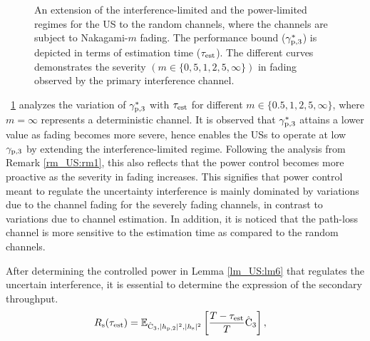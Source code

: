 \begin{figure}[!ht]
\caption{An extension of the interference-limited and the power-limited regimes for the US to the random channels, where the channels are subject to Nakagami-$m$ fading. The performance bound (${\gamma}_{\text{p,3}}^*$) is depicted in terms of estimation time ($\tau_{\text{est}}$). The different curves demonstrates the severity $(m \in \{0,5,1,2,5, \infty \})$ in fading observed by the primary interference channel.}
\label{fig_US:or_fad}
\end{figure}
\begin{remark} \label{rm_US:rm2}
\normalfont
\figurename~\ref{fig_US:or_fad} analyzes the variation of ${\gamma}_{\text{p,3}}^*$ with $\tau_{\text{est}}$ for different $m \in \{0.5, 1, 2, 5, \infty\}$, where $m = \infty$ represents a deterministic channel. It is observed that ${\gamma}_{\text{p,3}}^*$ attains a lower value as fading becomes more severe, hence enables the USs to operate at low ${\gamma}_{\text{p,3}}$ by extending the interference-limited regime. Following the analysis from Remark \ref{rm_US:rm1}, this also reflects that the power control becomes more proactive as the severity in fading increases. This signifies that power control meant to regulate the uncertainty interference is mainly dominated by variations due to the channel fading for the severely fading channels, in contrast to variations due to channel estimation. In addition, it is noticed that the path-loss channel is more sensitive to the estimation time as compared to the random channels.  
\end{remark}
After determining the controlled power in Lemma \ref{lm_US:lm6} that regulates the uncertain interference, it is essential to determine the expression of the secondary throughput.
\begin{align}
R_{\text{s}}(\tau_{\text{est}}) &= {\mathbb E}_{\hat{\text{{C}}}_{\text{3}}, |h_{\text{p,2}}|^2, |h_{\text{s}}|^2}\left[ \frac{T - \tau_{\text{est}}}{T} \hat{\text{{C}}}_{\text{3}}  \right], \label{eq_US:rs_fad} 
\end{align} 

